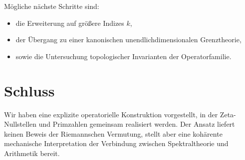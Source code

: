 \documentclass[11pt,a4paper]{article}
\begin{document}
Mögliche nächste Schritte sind:
\begin{itemize}
  \item die Erweiterung auf größere Indizes $k$,
  \item der Übergang zu einer kanonischen unendlichdimensionalen
        Grenztheorie,
  \item sowie die Untersuchung topologischer Invarianten der
        Operatorfamilie.
\end{itemize}

\section{Schluss}

Wir haben eine explizite operatorielle Konstruktion vorgestellt, in der
Zeta-Nullstellen und Primzahlen gemeinsam realisiert werden.
Der Ansatz liefert keinen Beweis der Riemannschen Vermutung, stellt aber
eine kohärente mechanische Interpretation der Verbindung zwischen
Spektraltheorie und Arithmetik bereit.
\end{document}
